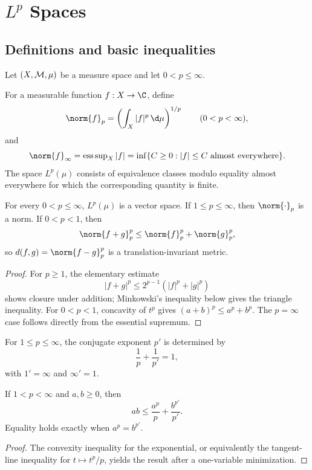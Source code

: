 \chapter{$L^p$ Spaces}

\section{Definitions and basic inequalities}

Let $(X,\mathcal{M},\mu)$ be a measure space and let $0<p\leq\infty$.

\begin{de}[$L^p$ norms]
For a measurable function $f:X\to\C$, define
\[
\norm{f}_p=\left(\int_X|f|^p\,\d\mu\right)^{1/p}
\qquad(0<p<\infty),
\]
and
\[
\norm{f}_\infty=\esssup_X|f|
 =\inf\{C\geq0:|f|\leq C\text{ almost everywhere}\}.
\]
The space $L^p(\mu)$ consists of equivalence classes modulo equality almost everywhere for which the corresponding quantity is finite.
\end{de}

\begin{prop}
For every $0<p\leq\infty$, $L^p(\mu)$ is a vector space. If $1\leq p\leq\infty$, then $\norm{\cdot}_p$ is a norm. If $0<p<1$, then
\[
\norm{f+g}_p^p\leq\norm{f}_p^p+\norm{g}_p^p,
\]
so $d(f,g)=\norm{f-g}_p^p$ is a translation-invariant metric.
\end{prop}

\begin{proof}
For $p\geq1$, the elementary estimate
\[
|f+g|^p\leq2^{p-1}(|f|^p+|g|^p)
\]
shows closure under addition; Minkowski's inequality below gives the triangle inequality. For $0<p<1$, concavity of $t^p$ gives $(a+b)^p\leq a^p+b^p$. The $p=\infty$ case follows directly from the essential supremum.
\end{proof}

\begin{de}
For $1\leq p\leq\infty$, the conjugate exponent $p'$ is determined by
\[
\frac1p+\frac1{p'}=1,
\]
with $1'=\infty$ and $\infty'=1$.
\end{de}

\begin{lem}
If $1<p<\infty$ and $a,b\geq0$, then
\[
ab\leq\frac{a^p}{p}+\frac{b^{p'}}{p'}.
\]
Equality holds exactly when $a^p=b^{p'}$.
\end{lem}

\begin{proof}
The convexity inequality for the exponential, or equivalently the tangent-line inequality for $t\mapsto t^p/p$, yields the result after a one-variable minimization.
\end{proof}

